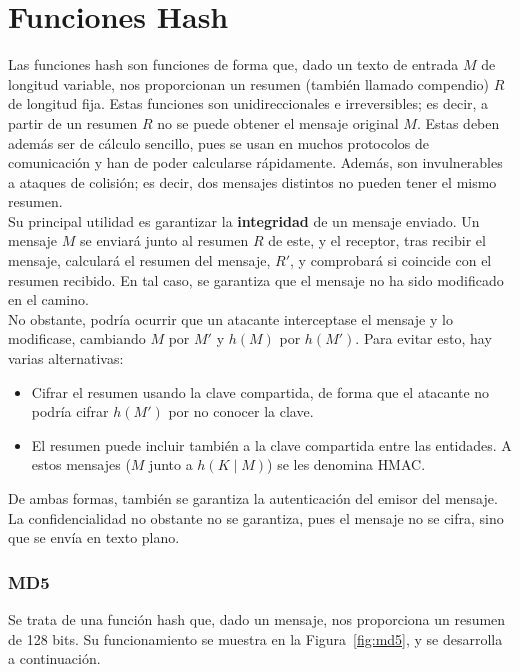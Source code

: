 \section{Funciones Hash}

Las funciones hash son funciones de forma que, dado un texto de entrada $M$ de longitud variable, nos proporcionan un resumen (también llamado compendio) $R$ de longitud fija. Estas funciones son unidireccionales e irreversibles; es decir, a partir de un resumen $R$ no se puede obtener el mensaje original $M$. Estas deben además ser de cálculo sencillo, pues se usan en muchos protocolos de comunicación y han de poder calcularse rápidamente. Además, son invulnerables a ataques de colisión; es decir, dos mensajes distintos no pueden tener el mismo resumen.\\



Su principal utilidad es garantizar la \textbf{integridad} de un mensaje enviado. Un mensaje $M$ se enviará junto al resumen $R$ de este, y el receptor, tras recibir el mensaje, calculará el resumen del mensaje, $R'$, y comprobará si coincide con el resumen recibido. En tal caso, se garantiza que el mensaje no ha sido modificado en el camino.\\

No obstante, podría ocurrir que un atacante interceptase el mensaje y lo modificase, cambiando $M$ por $M'$ y $h(M)$ por $h(M')$. Para evitar esto, hay varias alternativas:
\begin{itemize}
    \item Cifrar el resumen usando la clave compartida, de forma que el atacante no podría cifrar $h(M')$ por no conocer la clave.
    \item El resumen puede incluir también a la clave compartida entre las entidades. A estos mensajes ($M$ junto a $h(K\mid M)$) se les denomina \acrfull{HMAC}.
\end{itemize}
De ambas formas, también se garantiza la autenticación del emisor del mensaje. La confidencialidad no obstante no se garantiza, pues el mensaje no se cifra, sino que se envía en texto plano.

\subsubsection{\acrfull{MD5}}

Se trata de una función hash que, dado un mensaje, nos proporciona un resumen de 128 bits. Su funcionamiento se muestra en la Figura~\ref{fig:md5}, y se desarrolla a continuación.\\

